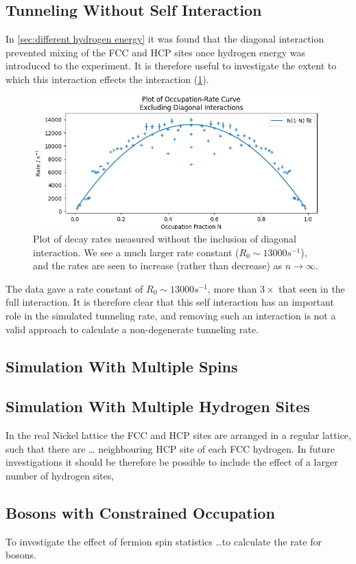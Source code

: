 \subsection{Tunneling Without Self Interaction}\label{sec:tunnelling no diagonal}
In \cref{sec:different hydrogen energy}
it was found that the diagonal interaction
prevented mixing of the FCC and HCP
sites once hydrogen energy was introduced
to the experiment. It is therefore
useful to investigate the extent
to which this interaction
effects the interaction (\cref{fig:non diagonal decay rates}).
\begin{figure}[htbp]
    \centering
    \includegraphics[width=0.7\linewidth]{Figures/Simulation/Occupation Rate Curve No Diagonal.png}
    \caption{Plot of decay rates measured without
        the inclusion of diagonal interaction.
        We see a much larger rate constant (\(R_0 \sim{} 13000 s^{-1}\)),
        and the rates are seen to
        increase (rather than
        decrease) as \(n\rightarrow{}\infty{}\).
    }\label{fig:non diagonal decay rates}
\end{figure}
The data gave
a rate constant
of \(R_0 \sim{} 13000 s^{-1}\),
more than \(3\times{}\) that seen in
the full interaction.
It is therefore
clear that this self interaction
has an important role
in the simulated
tunneling rate, and
removing such an interaction
is not a valid approach to
calculate a non-degenerate
tunneling rate.

\subsection{Simulation With Multiple Spins}



\subsection{Simulation With Multiple Hydrogen Sites}
In the real Nickel lattice the FCC and
HCP sites are arranged in a regular
lattice, such that there are \ldots
neighbouring HCP site of each FCC
hydrogen. In future investigations
it should be therefore be
possible to include the
effect of a larger number of
hydrogen sites,




\subsection{Bosons with Constrained Occupation}
To investigate the effect of fermion spin
statistics \ldots to calculate the rate
for bosons.
